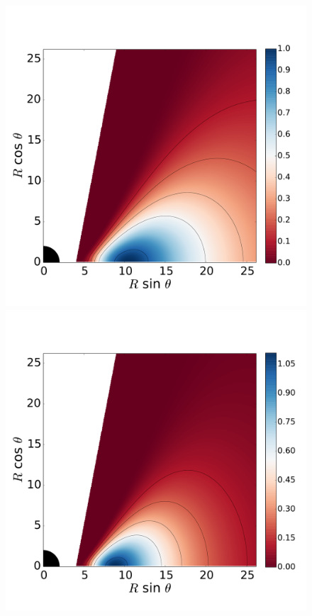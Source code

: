 \documentclass[twocolumn,aps,showpacs,showkeys,prd,superscriptaddress,byrevtex, amsmath]{revtex4-1}
\begin{document}
\begin{figure}
\centering
\includegraphics[scale=0.14]{figures/fig10_0_10.pdf}
\hspace{-0.3cm}
\includegraphics[scale=0.14]{figures/fig10_0_1.pdf}

\end{figure}
\end{document}
